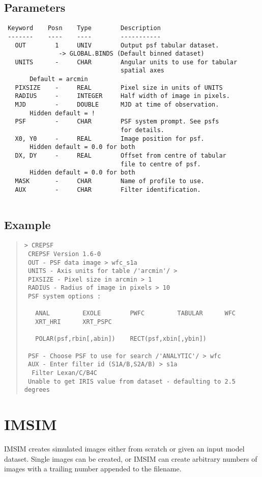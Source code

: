 \documentclass{book}
\renewcommand{\_}{{\tt\char'137}}     %
\begin{document}
\subsection{Parameters}
\begin{verbatim}
 Keyword    Posn    Type        Description
 -------    ----    ----        -----------
   OUT        1     UNIV        Output psf tabular dataset.
               -> GLOBAL.BINDS (Default binned dataset)
   UNITS      -     CHAR        Angular units to use for tabular
                                spatial axes
       Default = arcmin
   PIXSIZE    -     REAL        Pixel size in units of UNITS
   RADIUS     -     INTEGER     Half width of image in pixels.
   MJD        -     DOUBLE      MJD at time of observation.
       Hidden default = !
   PSF        -     CHAR        PSF system prompt. See psfs
                                for details.
   X0, Y0     -     REAL        Image position for psf.
       Hidden default = 0.0 for both
   DX, DY     -     REAL        Offset from centre of tabular
                                file to centre of psf.
       Hidden default = 0.0 for both
   MASK       -     CHAR        Name of profile to use.
   AUX        -     CHAR        Filter identification.
 
\end{verbatim}\subsection{Example}
\begin{quote}\begin{verbatim}
> CREPSF
 CREPSF Version 1.6-0
 OUT - PSF data image > wfc_s1a
 UNITS - Axis units for table /'arcmin'/ >
 PIXSIZE - Pixel size in arcmin > 1
 RADIUS - Radius of image in pixels > 10
 PSF system options :
 
   ANAL         EXOLE        PWFC         TABULAR      WFC
   XRT_HRI      XRT_PSPC
 
   POLAR(psf,rbin[,abin])    RECT(psf,xbin[,ybin])
 
 PSF - Choose PSF to use for search /'ANALYTIC'/ > wfc
 AUX - Enter filter id (S1A/B,S2A/B) > s1a
  Filter Lexan/C/B4C
 Unable to get IRIS value from dataset - defaulting to 2.5 degrees
 \end{verbatim}\end{quote}
\section{IMSIM}
IMSIM creates simulated images either from scratch or given an input
model dataset. Single images can be created, or IMSIM can create
arbitrary numbers of images with a trailing number appended to the
filename.
 
\end{document}
